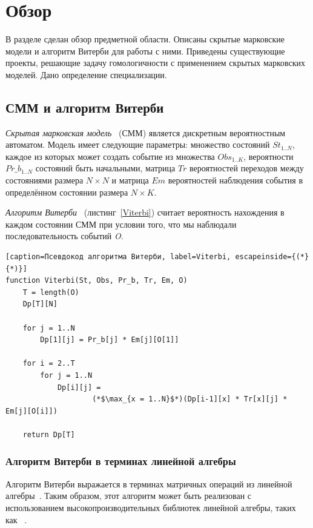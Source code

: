 \section{Обзор}
В разделе сделан обзор предметной области.
Описаны скрытые марковские модели и алгоритм Витерби для работы с ними.
Приведены существующие проекты, решающие задачу гомологичности с применением скрытых марковских моделей.
Дано определение специализации.


\subsection{СММ и алгоритм Витерби}
\label{HMM_Vit}
\emph{Скрытая марковская модель}~\cite{Eddy_CHMM} (СММ) 
является дискретным вероятностным автоматом.
Модель имеет следующие параметры: множество состояний $St_{1..N}$, 
каждое из которых может создать событие из множества
$Obs_{1..K}$, вероятности $Pr\_b_{1..N}$ состояний быть
начальными, матрица $Tr$ вероятностей переходов между состояниями размера $N
\times N$ и матрица $Em$ вероятностей наблюдения события в определённом 
состоянии размера ${N \times K}$.

\emph{Алгоритм Витерби}~\cite{Viterbi}
(листинг~\ref{Viterbi}) считает вероятность нахождения в 
каждом состоянии СММ при условии того, что мы наблюдали последовательность событий \emph{O}.

\begin{lstlisting}[caption=Псевдокод алгоритма Витерби, label=Viterbi, escapeinside={(*}{*)}]
function Viterbi(St, Obs, Pr_b, Tr, Em, O)
	T = length(O)
	Dp[T][N]

	for j = 1..N
		Dp[1][j] = Pr_b[j] * Em[j][O[1]]
	
	for i = 2..T
		for j = 1..N
			Dp[i][j] = 
					(*$\max_{x = 1..N}$*)(Dp[i-1][x] * Tr[x][j] * Em[j][O[i]])

	return Dp[T]
\end{lstlisting}


\subsubsection{Алгоритм Витерби в терминах линейной алгебры}
Алгоритм Витерби выражается в терминах матричных 
операций из линейной алгебры~\cite{LA_Viterbi}.
Таким образом, этот алгоритм может быть реализован с 
использованием высокопроизводительных библиотек линейной 
алгебры, таких как
~\cite{SuiteSparse}.

